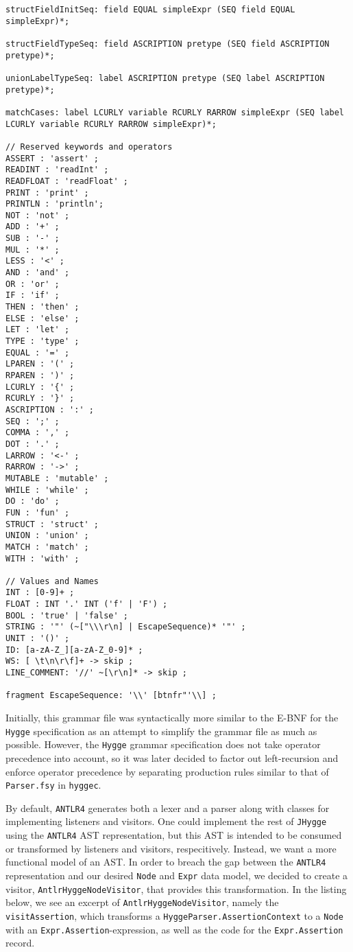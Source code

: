 \begin{lstlisting}
structFieldInitSeq: field EQUAL simpleExpr (SEQ field EQUAL simpleExpr)*;

structFieldTypeSeq: field ASCRIPTION pretype (SEQ field ASCRIPTION pretype)*;

unionLabelTypeSeq: label ASCRIPTION pretype (SEQ label ASCRIPTION pretype)*;

matchCases: label LCURLY variable RCURLY RARROW simpleExpr (SEQ label LCURLY variable RCURLY RARROW simpleExpr)*;

// Reserved keywords and operators
ASSERT : 'assert' ;
READINT : 'readInt' ;
READFLOAT : 'readFloat' ;
PRINT : 'print' ;
PRINTLN : 'println';
NOT : 'not' ;
ADD : '+' ;
SUB : '-' ;
MUL : '*' ;
LESS : '<' ;
AND : 'and' ;
OR : 'or' ;
IF : 'if' ;
THEN : 'then' ;
ELSE : 'else' ;
LET : 'let' ;
TYPE : 'type' ;
EQUAL : '=' ;
LPAREN : '(' ;
RPAREN : ')' ;
LCURLY : '{' ;
RCURLY : '}' ;
ASCRIPTION : ':' ;
SEQ : ';' ;
COMMA : ',' ;
DOT : '.' ;
LARROW : '<-' ;
RARROW : '->' ;
MUTABLE : 'mutable' ;
WHILE : 'while' ;
DO : 'do' ;
FUN : 'fun' ;
STRUCT : 'struct' ;
UNION : 'union' ;
MATCH : 'match' ;
WITH : 'with' ;

// Values and Names
INT : [0-9]+ ;
FLOAT : INT '.' INT ('f' | 'F') ;
BOOL : 'true' | 'false' ;
STRING : '"' (~["\\\r\n] | EscapeSequence)* '"' ;
UNIT : '()' ;
ID: [a-zA-Z_][a-zA-Z_0-9]* ;
WS: [ \t\n\r\f]+ -> skip ;
LINE_COMMENT: '//' ~[\r\n]* -> skip ;

fragment EscapeSequence: '\\' [btnfr"'\\] ; 
\end{lstlisting}

Initially, this grammar file was syntactically more similar to the E-BNF for the \texttt{Hygge} specification as an attempt to
simplify the grammar file as much as possible. However, the \texttt{Hygge} grammar specification does not take operator
precedence into account, so it was later decided to factor out left-recursion and enforce operator precedence by separating
production rules similar to that of \texttt{Parser.fsy} in \texttt{hyggec}.

By default, \texttt{ANTLR4} generates both a lexer and a parser along with classes for implementing listeners and visitors.
One could implement the rest of \texttt{JHygge} using the \texttt{ANTLR4} AST representation, but this AST is intended to
be consumed or transformed by listeners and visitors, respecitively. Instead, we want a more functional model of an AST.
In order to breach the gap between the \texttt{ANTLR4} representation and our desired \texttt{Node} and \texttt{Expr} data model,
we decided to create a visitor, \texttt{AntlrHyggeNodeVisitor}, that provides this transformation. In the listing below, we
see an excerpt of \texttt{AntlrHyggeNodeVisitor}, namely the \texttt{visitAssertion}, which transforms a \texttt{HyggeParser.AssertionContext}
to a \texttt{Node} with an \texttt{Expr.Assertion}-expression, as well as the code for the \texttt{Expr.Assertion} record.

